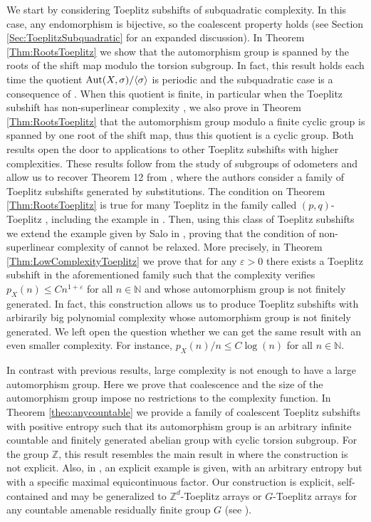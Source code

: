 \documentclass{daj}
\theoremstyle{plain}
\theoremstyle{definition}
\begin{document}
We start by considering Toeplitz subshifts of subquadratic complexity. In this case, any endomorphism is bijective, so the coalescent property holds (see Section \ref{Sec:ToeplitzSubquadratic} for an expanded discussion). In Theorem \ref{Thm:RootsToeplitz} we show that the automorphism group is spanned by the roots of the shift map modulo the torsion subgroup. In fact, this result holds each time the quotient ${\rm Aut}(X,\sigma)/\langle \sigma \rangle$ is periodic and the subquadratic case is a consequence of \cite{CyrKra}. 
When this quotient is finite, in particular when the Toeplitz subshift has non-superlinear complexity \cite{DonosoDurandMaassPetite}, we also prove in Theorem \ref{Thm:RootsToeplitz} that the automorphism group modulo a finite cyclic group is spanned by one root of the shift map, thus this quotient is a cyclic group. 
Both results open the door to applications to other Toeplitz subshifts with higher complexities. 
These results follow from the study of subgroups of odometers and allow us to recover Theorem 12 from \cite{CovenQuasYassawi}, where the authors consider a family of Toeplitz subshifts generated by substitutions. The condition on Theorem \ref{Thm:RootsToeplitz} is true for many Toeplitz in the family called $(p,q)$-Toeplitz \cite{CK}, including the 
example in \cite{Salo}. Then, using this class of Toeplitz subshifts we extend the example given by Salo in \cite{Salo}, proving that the condition of non-superlinear complexity of  \cite{CyrKra2,DonosoDurandMaassPetite} cannot be relaxed. More precisely, 
in Theorem \ref{Thm:LowComplexityToeplitz} we prove that for any $\varepsilon>0$ there exists a Toeplitz subshift in the aforementioned family such that the complexity verifies $p_X(n)\leq C n^{1+\varepsilon}$ for all $n \in \mathbb{N}$ and whose automorphism group is not  finitely generated. In fact, this construction allows us to produce Toeplitz subshifts with arbirarily big polynomial complexity whose automorphism group is not  finitely generated. We left open the question whether we can get the same result with an even smaller complexity. For instance, $p_X(n)/n\leq  C \log (n)$ for all $n\in \mathbb{N}$. 

In contrast with previous results, large complexity is not enough to have a large automorphism group. Here we prove that coalescence and the size of the automorphism group impose no restrictions to the complexity function. In Theorem \ref{theo:anycountable} we provide a family of coalescent Toeplitz subshifts with positive entropy such that its automorphism group is an arbitrary   infinite countable and finitely generated abelian group with cyclic torsion subgroup. For the group $\mathbb{Z}$, this result resembles the main result in \cite{BulatekK} where the construction is not explicit. Also, in \cite{DownarowiczKwiatkowskiLacroix:1995}, an explicit example is  given, with an arbitrary entropy but with a specific maximal equicontinuous factor. Our construction is explicit, self-contained and may be generalized to $\mathbb{Z}^d$-Toeplitz arrays or $G$-Toeplitz arrays for any countable amenable residually finite group $G$ (see \cite{CortezPetite:2008}). 
\end{document}
